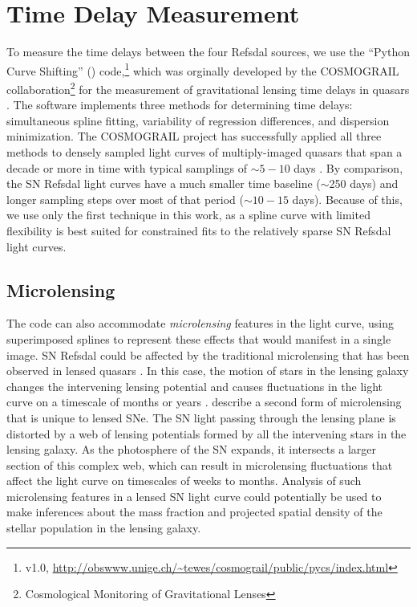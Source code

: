 \section{Time Delay Measurement}\label{sec:TimeDelayMeasurement}

To measure the time delays between the four Refsdal sources, we use the ``Python Curve Shifting'' (\PyCS) code,\footnote{v1.0, \url{http://obswww.unige.ch/~tewes/cosmograil/public/pycs/index.html}} which was orginally developed by the COSMOGRAIL collaboration\footnote{Cosmological Monitoring of Gravitational Lenses} for the measurement of gravitational lensing time delays in quasars \citet{Tewes:2013}.  The \pycs software implements three methods for determining time delays: simultaneous spline fitting, variability of regression differences, and dispersion minimization.  The COSMOGRAIL project has successfully applied all three methods to densely sampled light curves of multiply-imaged quasars that span a decade or more in time with typical samplings of $\sim5-10$ days \citep[e.g.][]{Tewes:2013a}.   By comparison, the SN Refsdal light curves have a much smaller time baseline ($\sim$250 days) and longer sampling steps over most of that period ($\sim10-15$ days).  Because of this,  we use only the first technique in this work, as a spline curve with limited flexibility is best suited for constrained fits to the relatively sparse SN Refsdal light curves.

\subsection{Microlensing}\label{sec:Microlensing}
The \pycs code can also accommodate {\it microlensing} features in the light curve, using superimposed splines to represent these effects that would manifest in a single image.  SN Refsdal could be affected by the traditional microlensing that has been observed in lensed quasars \citep[e.g.][]{Kochanek:2004}.  In this case, the motion of stars in the lensing galaxy changes the intervening lensing potential and causes fluctuations in the light curve on a timescale of months or years  \citep[e.g.][]{Wyithe:2001,Schechter:2002,Schechter:2004}.  \citet{Dobler:2006} describe a second form of microlensing that is unique to lensed SNe.  The SN light passing through the lensing plane is distorted by a web of lensing potentials formed by all the intervening stars in the lensing galaxy.  As the photosphere of the SN expands, it intersects a larger section of this complex web, which can result in microlensing fluctuations that affect the light curve on timescales of weeks to months.  Analysis of such microlensing features in a lensed SN light curve could potentially be used to make inferences about the mass fraction and projected spatial density of the stellar population in the lensing galaxy.

